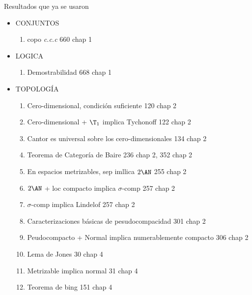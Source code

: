 \begin{flushright}
	Resultados que ya se usaron
\end{flushright}
\begin{itemize}
	\item CONJUNTOS
	      \begin{enumerate}
		      \item copo \textit{c.c.c} \hfill 660 chap 1
	      \end{enumerate}
	\item LOGICA
	      \begin{enumerate}
		      \item Demostrabilidad \hfill 668 chap 1
	      \end{enumerate}
	\item TOPOLOGÍA
	      \begin{enumerate}
		      \item Cero-dimensional, condición suficiente \hfill 120 chap 2
		      \item Cero-dimensional + $\T_1$ implica Tychonoff \hfill 122 chap 2
		      \item Cantor es universal sobre los cero-dimensionales \hfill 134 chap 2
		      \item Teorema de Categoría de Baire \hfill 236 chap 2, 352 chap 2
		      \item En espacios metrizables, sep imllica $2\AN$ \hfill 255 chap 2
		      \item $2\AN$ + loc compacto implica $\sigma$-comp \hfill 257 chap 2
		      \item $\sigma$-comp implica Lindelof \hfill 257 chap 2
		      \item Caracterizaciones básicas de pesudocompacidad	301 chap 2
		      \item Peudocompacto + Normal implica numerablemente compacto \hfill 306 chap 2
		      \item Lema de Jones \hfill 30 chap 4
		      \item Metrizable implica normal \hfill 31 chap 4
		      \item Teorema de bing \hfil 151 chap 4
	      \end{enumerate}
\end{itemize}